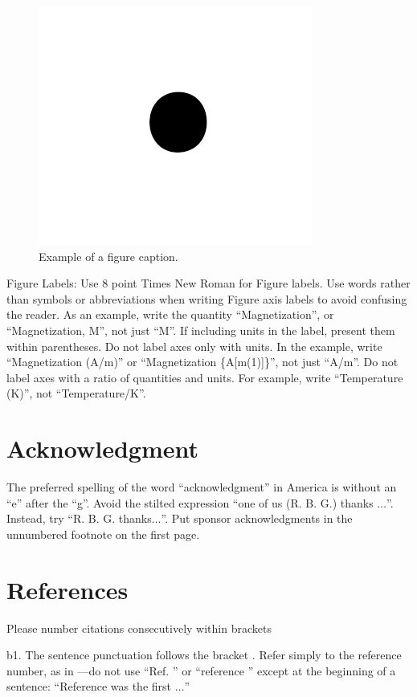 \documentclass[conference]{IEEEtran}
\begin{document}
\begin{figure}[htbp]
\centerline{\includegraphics{fig1.png}}
\caption{Example of a figure caption.}
\label{fig}
\end{figure}

Figure Labels: Use 8 point Times New Roman for Figure labels. Use words 
rather than symbols or abbreviations when writing Figure axis labels to 
avoid confusing the reader. As an example, write the quantity 
``Magnetization'', or ``Magnetization, M'', not just ``M''. If including 
units in the label, present them within parentheses. Do not label axes only 
with units. In the example, write ``Magnetization (A/m)'' or ``Magnetization 
\{A[m(1)]\}'', not just ``A/m''. Do not label axes with a ratio of 
quantities and units. For example, write ``Temperature (K)'', not 
``Temperature/K''.

\section*{Acknowledgment}

The preferred spelling of the word ``acknowledgment'' in America is without 
an ``e'' after the ``g''. Avoid the stilted expression ``one of us (R. B. 
G.) thanks $\ldots$''. Instead, try ``R. B. G. thanks$\ldots$''. Put sponsor 
acknowledgments in the unnumbered footnote on the first page.

\section*{References}

Please number citations consecutively within brackets \



{b1}. The 
sentence punctuation follows the bracket \cite{b2}. Refer simply to the reference 
number, as in \cite{b3}---do not use ``Ref. \cite{b3}'' or ``reference \cite{b3}'' except at 
the beginning of a sentence: ``Reference \cite{b3} was the first $\ldots$''
\end{document}
